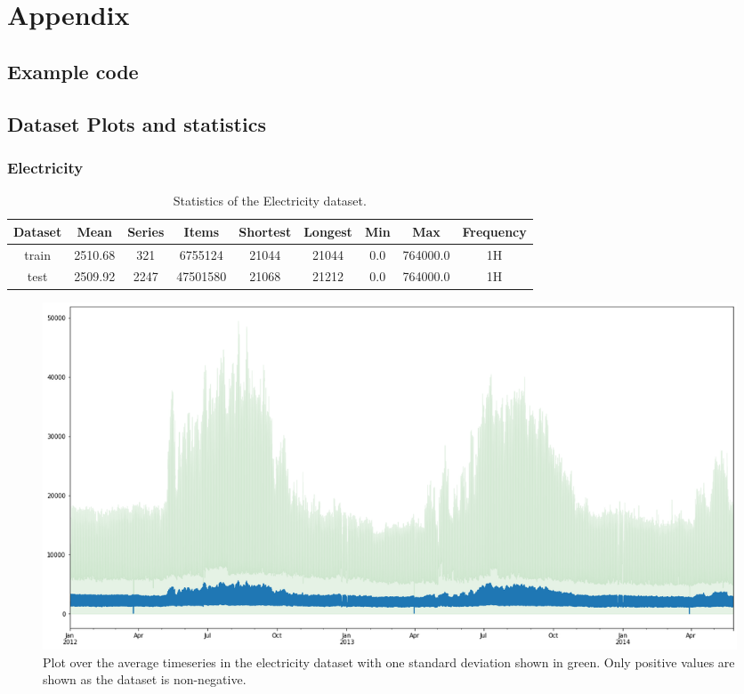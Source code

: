 \chapter{Appendix} 
\section{Example code}

\section{Dataset Plots and statistics}
\clearpage
\subsection{Electricity}
\begin{table}[htb]
    \begin{tabular}{||c | c c c c c c c c ||} 
        \hline
        Dataset & Mean & Series & Items & Shortest & Longest & Min & Max & Frequency\\ [0.5ex] 
        \hline\hline
        train & 2510.68 & 321 & 6755124 & 21044 & 21044 & 0.0 & 764000.0 & 1H\\ 
        \hline
        test & 2509.92 & 2247 & 47501580 & 21068 & 21212 & 0.0 & 764000.0 & 1H\\
        \hline
    \end{tabular}
    \caption{Statistics of the Electricity dataset.}
\end{table}

\begin{figure}[htb]
    \centering
      \includegraphics[width=\linewidth]{4_designing/figures/electricity_plot.png}
      \caption{Plot over the average timeseries in the electricity dataset with one standard deviation shown in green. Only positive values are shown as the dataset is non-negative.}
      \label{fig:electricity_plot}
    \endminipage\hfill
\end{figure}

